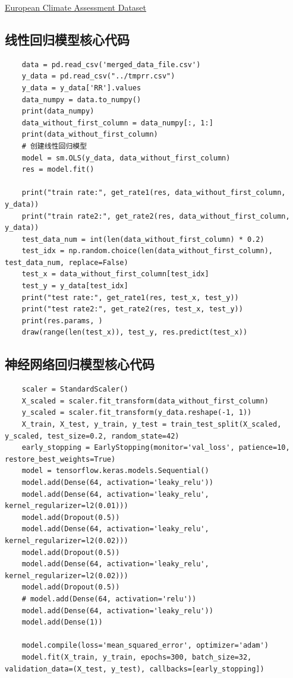 \documentclass[UTF8, a4paper]{ctexart}
\begin{document}
\href{https://www.ecad.eu/}{European Climate Assessment  Dataset}

\subsection{线性回归模型核心代码}\label{liner_program}

\begin{lstlisting}
	data = pd.read_csv('merged_data_file.csv')
	y_data = pd.read_csv("../tmprr.csv")
	y_data = y_data['RR'].values
	data_numpy = data.to_numpy()
	print(data_numpy)
	data_without_first_column = data_numpy[:, 1:]
	print(data_without_first_column)
	# 创建线性回归模型
	model = sm.OLS(y_data, data_without_first_column)
	res = model.fit()
	
	print("train rate:", get_rate1(res, data_without_first_column, y_data))
	print("train rate2:", get_rate2(res, data_without_first_column, y_data))
	test_data_num = int(len(data_without_first_column) * 0.2)
	test_idx = np.random.choice(len(data_without_first_column), test_data_num, replace=False)
	test_x = data_without_first_column[test_idx]
	test_y = y_data[test_idx]
	print("test rate:", get_rate1(res, test_x, test_y))
	print("test rate2:", get_rate2(res, test_x, test_y))
	print(res.params, )
	draw(range(len(test_x)), test_y, res.predict(test_x))
\end{lstlisting}

\subsection{神经网络回归模型核心代码}\label{net_program}
\begin{lstlisting}
	scaler = StandardScaler()
	X_scaled = scaler.fit_transform(data_without_first_column)
	y_scaled = scaler.fit_transform(y_data.reshape(-1, 1))
	X_train, X_test, y_train, y_test = train_test_split(X_scaled, y_scaled, test_size=0.2, random_state=42)
	early_stopping = EarlyStopping(monitor='val_loss', patience=10, restore_best_weights=True)
	model = tensorflow.keras.models.Sequential()
	model.add(Dense(64, activation='leaky_relu'))
	model.add(Dense(64, activation='leaky_relu', kernel_regularizer=l2(0.01)))
	model.add(Dropout(0.5))
	model.add(Dense(64, activation='leaky_relu', kernel_regularizer=l2(0.02)))
	model.add(Dropout(0.5))
	model.add(Dense(64, activation='leaky_relu', kernel_regularizer=l2(0.02)))
	model.add(Dropout(0.5))
	# model.add(Dense(64, activation='relu'))
	model.add(Dense(64, activation='leaky_relu'))
	model.add(Dense(1))
	
	model.compile(loss='mean_squared_error', optimizer='adam')
	model.fit(X_train, y_train, epochs=300, batch_size=32, validation_data=(X_test, y_test), callbacks=[early_stopping])
\end{lstlisting}
\end{document}
